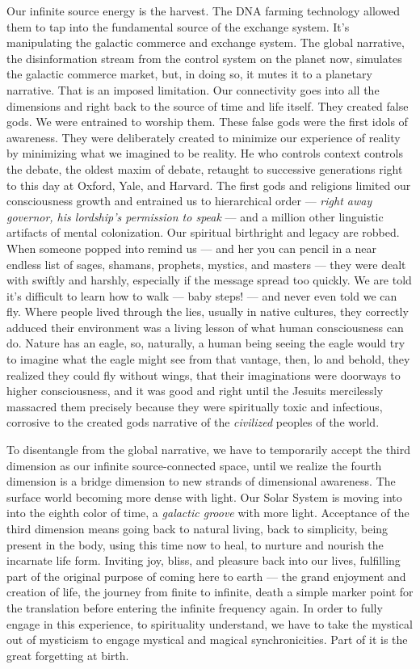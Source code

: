 \documentclass[letterpaper,9pt,twoside,titlepage,onecolumn,openany]{book}
\begin{document}
Our infinite source energy is the harvest. The DNA farming technology
allowed them to tap into the fundamental source of the exchange system.
It's manipulating the galactic commerce and exchange system. The global
narrative, the disinformation stream from the control system on the
planet now, simulates the galactic commerce market, but, in doing so, it
mutes it to a planetary narrative. That is an imposed limitation. Our
connectivity goes into all the dimensions and right back to the source
of time and life itself. They created false gods. We were entrained to
worship them. These false gods were the first idols of awareness. They
were deliberately created to minimize our experience of reality by
minimizing what we imagined to be reality. He who controls context
controls the debate, the oldest maxim of debate, retaught to successive
generations right to this day at Oxford, Yale, and Harvard. The first
gods and religions limited our consciousness growth and entrained us to
hierarchical order --- \emph{right away governor, his lordship's
permission to speak} --- and a million other linguistic artifacts of mental
colonization. Our spiritual birthright and legacy are robbed. When
someone popped into remind us --- and her you can pencil in a near
endless list of sages, shamans, prophets, mystics, and masters --- they
were dealt with swiftly and harshly, especially if the message spread
too quickly. We are told it's difficult to learn how to walk --- baby
steps! --- and never even told we can fly. Where people lived through
the lies, usually in native cultures, they correctly adduced their
environment was a living lesson of what human consciousness can do.
Nature has an eagle, so, naturally, a human being seeing the eagle would
try to imagine what the eagle might see from that vantage, then, lo and
behold, they realized they could fly without wings, that their
imaginations were doorways to higher consciousness, and it was good and
right until the Jesuits mercilessly massacred them precisely because
they were spiritually toxic and infectious, corrosive to the created
gods narrative of the \emph{civilized} peoples of the world.

To disentangle from the global narrative, we have to temporarily accept
the third dimension as our infinite source-connected space, until we
realize the fourth dimension is a bridge dimension to new strands of
dimensional awareness. The surface world becoming more dense with light.
Our Solar System is moving into into the eighth color of time, a
\emph{galactic groove} with more light. Acceptance of the third
dimension means going back to natural living, back to simplicity, being
present in the body, using this time now to heal, to nurture and nourish
the incarnate life form. Inviting joy, bliss, and pleasure back into our
lives, fulfilling part of the original purpose of coming here to earth
--- the grand enjoyment and creation of life, the journey from finite to
infinite, death a simple marker point for the translation before
entering the infinite frequency again. In order to fully engage in this
experience, to spirituality understand, we have to take the mystical out
of mysticism to engage mystical and magical synchronicities. Part of it
is the great forgetting at birth.
\end{document}

